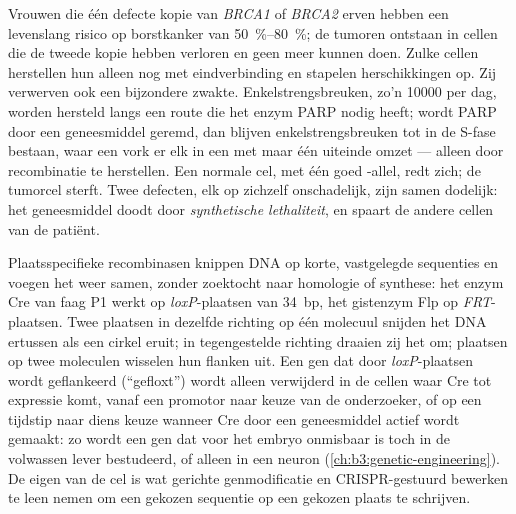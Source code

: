 \begin{example}\label{ex:b3:dna-repair:parp}
Vrouwen die één defecte kopie van \emph{BRCA1} of \emph{BRCA2} erven
hebben een levenslang risico op borstkanker van \qtyrange{50}{80}{\%};
de tumoren ontstaan in cellen die de tweede kopie hebben verloren en
geen  meer kunnen doen. Zulke cellen herstellen
hun  alleen nog met eindverbinding en stapelen
herschikkingen op. Zij verwerven ook een bijzondere zwakte.
Enkelstrengsbreuken, zo'n \num{10000} per dag, worden hersteld langs
een route die het enzym PARP nodig heeft; wordt PARP door een
geneesmiddel geremd, dan blijven enkelstrengsbreuken tot in de S-fase
bestaan, waar een vork er elk in een  met maar één
uiteinde omzet --- alleen door recombinatie te herstellen. Een normale
cel, met één goed \emph{}-allel, redt zich; de tumorcel sterft.
Twee defecten, elk op zichzelf onschadelijk, zijn samen dodelijk: het
geneesmiddel doodt door \emph{synthetische lethaliteit}, en spaart de
andere cellen van de patiënt.
\end{example}

\begin{proposition}\label{prop:b3:dna-repair:tools}
Plaatsspecifieke recombinasen knippen DNA op korte, vastgelegde
sequenties en voegen het weer samen, zonder zoektocht naar homologie of
synthese: het enzym Cre van faag P1 werkt op \emph{loxP}-plaatsen van
\qty{34}{bp}, het gistenzym Flp op \emph{FRT}-plaatsen. Twee plaatsen
in dezelfde richting op één molecuul snijden het DNA ertussen als een
cirkel eruit; in tegengestelde richting draaien zij het om; plaatsen op
twee moleculen wisselen hun flanken uit. Een gen dat door
\emph{loxP}-plaatsen wordt geflankeerd (``gefloxt'') wordt alleen
verwijderd in de cellen waar Cre tot expressie komt, vanaf een promotor
naar keuze van de onderzoeker, of op een tijdstip naar diens keuze
wanneer Cre door een geneesmiddel actief wordt gemaakt: zo wordt een
gen dat voor het embryo onmisbaar is toch in de volwassen lever
bestudeerd, of alleen in een neuron
(\cref{ch:b3:genetic-engineering}). De eigen  van
de cel is wat gerichte genmodificatie en CRISPR-gestuurd bewerken te
leen nemen om een gekozen sequentie op een gekozen plaats te schrijven.
\end{proposition}

